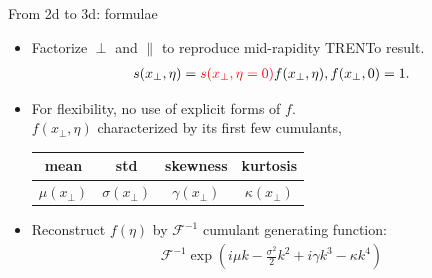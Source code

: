 \documentclass[11pt]{beamer}
\begin{document}
\begin{frame}{From 2d to 3d: formulae}
\begin{itemize}
\item Factorize $\perp$ and $\parallel$ to reproduce mid-rapidity TRENTo result.
\begin{eqnarray}
\nonumber
s(x_\perp, \eta) = {\color{red}s(x_\perp, \eta = 0)}f(x_\perp, \eta), f(x_\perp, 0) = 1.
\end{eqnarray}
\item For flexibility, no use of explicit forms of $f$. \\$f(x_\perp, \eta)$ characterized by its first few cumulants,

\begin{center}
\begin{tabular}{cccc}
\hline
	mean	 	&	std   	&	skewness		&	kurtosis		\\
\hline
	$\mu(x_\perp)$	& $\sigma(x_\perp)$ & $\gamma(x_\perp)$ & $\kappa(x_\perp)$	\\
\hline
\end{tabular}
\end{center}

\item Reconstruct $ f(\eta) $ by $\mathscr{F}^{-1}$ cumulant generating function:
\begin{eqnarray}\label{naive_fourier}
\nonumber
\mathscr{F}^{-1}\exp\left(i \mu k - \frac{\sigma^2}{2}k^2 + i \gamma k^3 - \kappa k^4 \right)
\end{eqnarray}
\end{itemize}
\end{frame}
\end{document}
